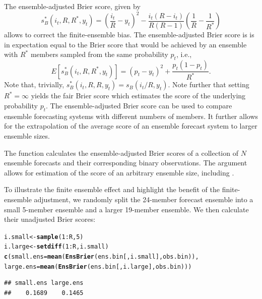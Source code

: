 \documentclass[article]{jss}\usepackage{graphicx, color}
\makeatletter
\newcommand{\hlfunctioncall}[1]{\textcolor[rgb]{0,0.501960784313725,0.752941176470588}{\textbf{#1}}}%
\newenvironment{kframe}{%
 \def\at@end@of@kframe{}%
 \ifinner\ifhmode%
  \def\at@end@of@kframe{\end{minipage}}%
  \begin{minipage}{\columnwidth}%
 \fi\fi%
 \def\FrameCommand##1{\hskip\@totalleftmargin \hskip-\fboxsep
 \colorbox{shadecolor}{##1}\hskip-\fboxsep
     \hskip-\linewidth \hskip-\@totalleftmargin \hskip\columnwidth}%
 \MakeFramed {\advance\hsize-\width
   \@totalleftmargin\z@ \linewidth\hsize
   \@setminipage}}%
 {\par\unskip\endMakeFramed%
 \at@end@of@kframe}
\newenvironment{knitrout}{}{} %
\makeatother
\begin{document}
The ensemble-adjusted Brier score, given by \citep{ferro2008effect}
%
\begin{equation}
s_{B}^*(i_t, R, R^*, y_t) = \left(\frac{i_t}{R} - y_t\right)^2 - \frac{i_t(R-i_t)}{R(R-1)}\left(\frac{1}{R} - \frac{1}{R^*}\right)
\label{eq:ens-brier}
\end{equation}
%
allows to correct the finite-ensemble bias.
The ensemble-adjusted Brier score is is in expectation equal to the Brier score that would be achieved by an ensemble with $R^*$ members sampled from the same probability $p_t$, i.e., 
%
\begin{equation}
E\left[s_{B}^*(i_t, R, R^*, y_t)\right] = (p_t - y_t)^2 + \frac{p_t(1-p_t)}{R^*}.
\end{equation}
%
Note that, trivially, $s_{B}^*(i_t, R, R, y_t) = s_{B}(i_t/R, y_t)$.
Note further that setting $R^*=\infty$ yields the fair Brier score \citep{ferro2013fair} which estimates the score of the underlying probability $p_t$.
The ensemble-adjusted Brier score can be used to compare ensemble forecasting systems with different numbers of members.
It further allows for the extrapolation of the average score of an ensemble forecast system to larger ensemble sizes.


The  function  calculates the ensemble-adjusted Brier scores of a collection of $N$ ensemble forecasts and their corresponding binary observations. 
The argument  allows for estimation of the score of an arbitrary ensemble size, including .


To illustrate the finite ensemble effect and highlight the benefit of the finite-ensemble adjustment, we randomly split the 24-member forecast ensemble into a small 5-member ensemble and a larger 19-member ensemble.
We then calculate their unadjusted Brier scores:

\begin{knitrout}
\color{fgcolor}\begin{kframe}
\begin{alltt}
i.small <- \hlfunctioncall{sample}(1:R, 5)
i.large <- \hlfunctioncall{setdiff}(1:R, i.small)
\hlfunctioncall{c}(small.ens=\hlfunctioncall{mean}(\hlfunctioncall{EnsBrier}(ens.bin[, i.small], obs.bin)), 
  large.ens=\hlfunctioncall{mean}(\hlfunctioncall{EnsBrier}(ens.bin[, i.large], obs.bin)))
\end{alltt}
\begin{verbatim}
## small.ens large.ens 
##    0.1689    0.1465
\end{verbatim}
\end{kframe}
\end{knitrout}
\end{document}
